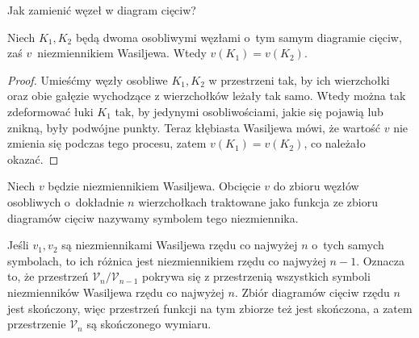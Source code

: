 \begin{tobedone}
    Jak zamienić węzeł w diagram cięciw?
\end{tobedone}

\begin{proposition}
    Niech $K_1, K_2$ będą dwoma osobliwymi węzłami o~tym samym diagramie cięciw, zaś $v$~niezmiennikiem Wasiljewa.
    Wtedy $v(K_1) = v(K_2)$.
\end{proposition}

\begin{proof}
    Umieśćmy węzły osobliwe $K_1, K_2$ w przestrzeni tak, by ich wierzchołki oraz obie gałęzie wychodzące z wierzchołków leżały tak samo. Wtedy można tak zdeformować łuki $K_1$ tak, by jedynymi osobliwościami, jakie się pojawią lub znikną, były podwójne punkty.
    Teraz kłębiasta Wasiljewa mówi, że wartość $v$ nie zmienia się podczas tego procesu, zatem $v(K_1) = v(K_2)$, co należało okazać.
\end{proof}

\begin{definition}
    Niech $v$ będzie niezmiennikiem Wasiljewa.
    Obcięcie $v$ do zbioru węzłów osobliwych o~dokładnie $n$ wierzchołkach traktowane jako funkcja ze zbioru diagramów cięciw nazywamy symbolem tego niezmiennika.
\end{definition}

Jeśli $v_1, v_2$ są niezmiennikami Wasiljewa rzędu co najwyżej $n$ o~tych samych symbolach, to ich różnica jest niezmiennikiem rzędu co najwyżej $n - 1$.
Oznacza to, że przestrzeń $\mathcal V_n/\mathcal V_{n-1}$ pokrywa się z przestrzenią wszystkich symboli niezmienników Wasiljewa rzędu co najwyżej $n$.
Zbiór diagramów cięciw rzędu $n$ jest skończony, więc przestrzeń funkcji na tym zbiorze też jest skończona, a zatem przestrzenie $\mathcal V_n$ są skończonego wymiaru.

